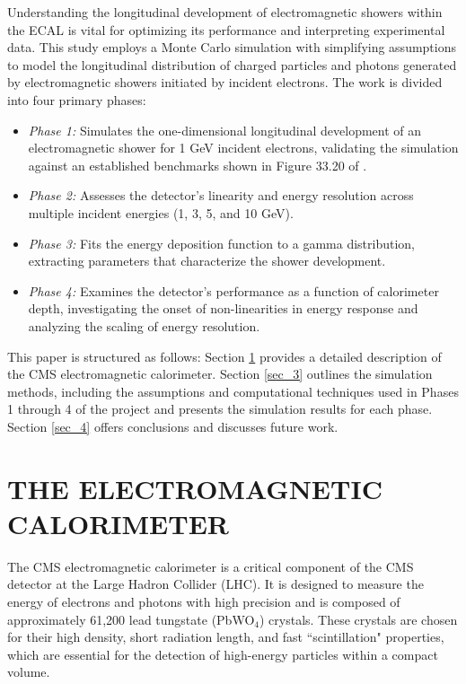 \documentclass[twocolumn]{aastex631}
\begin{document}
Understanding the longitudinal development of electromagnetic showers within
the ECAL is vital for optimizing its performance and interpreting experimental
data. This study employs a Monte Carlo simulation with simplifying assumptions
to model the longitudinal distribution of charged particles and photons
generated by electromagnetic showers initiated by incident electrons. The work
is divided into four primary phases:

\begin{itemize}
    \item[1.] \textit{Phase 1:} Simulates the one-dimensional longitudinal
        development of an electromagnetic shower for 1 GeV
        incident electrons, validating the simulation against an established
        benchmarks shown in Figure 33.20 of \cite{Groom2019ParticlePassage}. 
    \item[2.] \textit{Phase 2:} Assesses the detector’s linearity and energy
        resolution across multiple incident energies (1, 3, 5, and 10 GeV).
    \item[3.] \textit{Phase 3:} Fits the energy deposition function to a gamma
        distribution, extracting parameters that characterize the shower
        development. 
    \item[4.] \textit{Phase 4:} Examines the detector’s performance as a
        function of calorimeter depth, investigating the onset of
        non-linearities in energy response and analyzing the scaling of energy
        resolution.
\end{itemize}


This paper is structured as follows: Section \ref{sec_2} provides a detailed
description of the CMS electromagnetic calorimeter. Section \ref{sec_3} outlines
the simulation methods, including the assumptions and computational techniques
used in Phases 1 through 4 of the project and presents the
simulation results for each phase. Section \ref{sec_4} offers conclusions and
discusses future work. 


\section{THE ELECTROMAGNETIC CALORIMETER} \label{sec_2}

The CMS electromagnetic calorimeter is a critical component of the CMS detector
at the Large Hadron Collider (LHC). It is designed to measure the energy of
electrons and photons with high precision and is composed of approximately
61,200 lead tungstate (PbWO$_\text{4}$) crystals. These crystals are chosen for their high
density, short radiation length, and fast ``scintillation" properties, which are essential
for the detection of high-energy particles within a compact volume.
\end{document}
